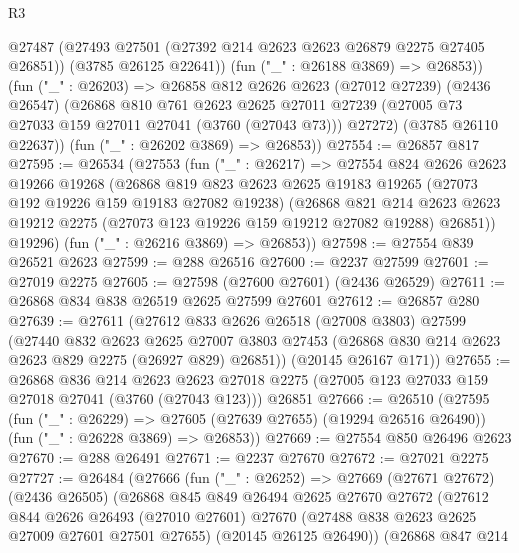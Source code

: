 \begin{lexlean}{R3}
\begin{coremodule}
        @27487
          (@27493 @27501 (@27392 @214 @2623 @2623 @26879 @2275 @27405 @26851))
          (@3785 @26125 @22641))
        (fun ("_" : @26188 @3869) => @26853))
      (fun ("_" : @26203) =>
      @26858
        @812
        @2626
        @2623
        (@27012 @27239)
        (@2436 @26547)
        (@26868
          @810
          @761
          @2623
          @2625
          @27011
          @27239
          (@27005 @73 @27033 @159 @27011 @27041 (@3760 (@27043 @73)))
          @27272)
        (@3785 @26110 @22637))
      (fun ("_" : @26202 @3869) => @26853))
@27554 := @26857 @817
@27595 := @26534
    (@27553
      (fun ("_" : @26217) =>
      @27554
        @824
        @2626
        @2623
        @19266
        @19268
        (@26868
          @819
          @823
          @2623
          @2625
          @19183
          @19265
          (@27073 @192 @19226 @159 @19183 @27082 @19238)
          (@26868
            @821
            @214
            @2623
            @2623
            @19212
            @2275
            (@27073 @123 @19226 @159 @19212 @27082 @19288)
            @26851))
        @19296)
      (fun ("_" : @26216 @3869) => @26853))
@27598 := @27554 @839 @26521 @2623
@27599 := @288 @26516
@27600 := @2237 @27599
@27601 := @27019 @2275
@27605 := @27598 (@27600 @27601) (@2436 @26529)
@27611 := @26868 @834 @838 @26519 @2625 @27599 @27601
@27612 := @26857 @280
@27639 := @27611
    (@27612
      @833
      @2626
      @26518
      (@27008 @3803)
      @27599
      (@27440
        @832
        @2623
        @2625
        @27007
        @3803
        @27453
        (@26868 @830 @214 @2623 @2623 @829 @2275 (@26927 @829) @26851))
      (@20145 @26167 @171))
@27655 := @26868
    @836
    @214
    @2623
    @2623
    @27018
    @2275
    (@27005 @123 @27033 @159 @27018 @27041 (@3760 (@27043 @123)))
    @26851
@27666 := @26510
    (@27595
      (fun ("_" : @26229) => @27605 (@27639 @27655) (@19294 @26516 @26490))
      (fun ("_" : @26228 @3869) => @26853))
@27669 := @27554 @850 @26496 @2623
@27670 := @288 @26491
@27671 := @2237 @27670
@27672 := @27021 @2275
@27727 := @26484
    (@27666
      (fun ("_" : @26252) =>
      @27669
        (@27671 @27672)
        (@2436 @26505)
        (@26868
          @845
          @849
          @26494
          @2625
          @27670
          @27672
          (@27612
            @844
            @2626
            @26493
            (@27010 @27601)
            @27670
            (@27488 @838 @2623 @2625 @27009 @27601 @27501 @27655)
            (@20145 @26125 @26490))
          (@26868
            @847
            @214

\end{coremodule}
\end{lexlean}
